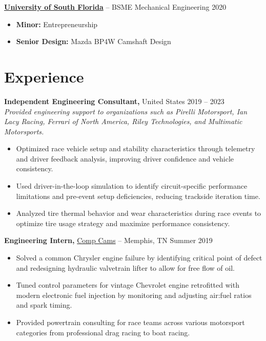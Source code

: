 \documentclass[12pt,letterpaper]{article} %
\begin{document}
\vspace{-5pt}
\textbf{\href{https://www.usf.edu/engineering/me/}{University of South Florida}} -- BSME Mechanical Engineering \hfill 2020 \\
\vspace{-9pt}
\begin{itemize}[itemsep = -4pt]
    \item \textbf{Minor:} Entrepreneurship
    \item \textbf{Senior Design:} Mazda BP4W Camshaft Design
\end{itemize}

\vspace{-24.5pt} %


\section*{Experience}
\textbf{Independent Engineering Consultant,} United States \hfill 2019 -- 2023 \\
\vspace{3pt}
\textit{Provided engineering support to organizations such as Pirelli Motorsport, Ian Lacy Racing, Ferrari of North America, Riley Technologies, and Multimatic Motorsports.}
\vspace{-5pt}
\begin{itemize}
  \item Optimized race vehicle setup and stability characteristics through telemetry and driver feedback analysis, improving driver confidence and vehicle consistency.
  \item Used driver-in-the-loop simulation to identify circuit-specific performance limitations and pre-event setup deficiencies, reducing trackside iteration time.
  \item Analyzed tire thermal behavior and wear characteristics during race events to optimize tire usage strategy and maximize performance consistency.
\end{itemize}

\textbf{Engineering Intern,} \href{https://www.compcams.com/}{Comp Cams} -- Memphis, TN \hfill Summer 2019 \\
\vspace{-9pt}
\begin{itemize}
  \item Solved a common Chrysler engine failure by identifying critical point of defect and redesigning hydraulic valvetrain lifter to allow for free flow of oil.
  \item Tuned control parameters for vintage Chevrolet engine retrofitted with modern electronic fuel injection by monitoring and adjusting air:fuel ratios and spark timing.
  \item Provided powertrain consulting for race teams across various motorsport categories from professional drag racing to boat racing.
\end{itemize}
\end{document}
